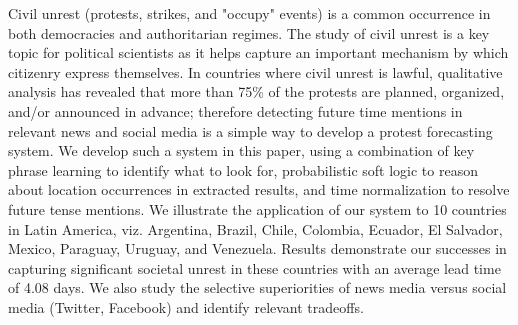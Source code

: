 Civil unrest (protests, strikes, and "occupy" events) is a common occurrence in both democracies and authoritarian regimes. The study of civil unrest is a key topic for political scientists as it helps capture an important mechanism by which citizenry express themselves. In countries where civil unrest is lawful, qualitative analysis has revealed that more than 75\% of the protests are planned, organized, and/or announced in advance; therefore detecting future time mentions in relevant news and social media is a simple way to develop a protest forecasting system. We develop such a system in this paper, using a combination of key phrase learning to identify what to look for, probabilistic soft logic to reason about location occurrences in extracted results, and time normalization to resolve future tense mentions. We illustrate the application of our system to 10 countries in Latin America, viz. Argentina, Brazil, Chile, Colombia, Ecuador, El Salvador, Mexico, Paraguay, Uruguay, and Venezuela. Results demonstrate our successes in capturing significant societal unrest in these countries with an average lead time of 4.08 days. We also study the selective superiorities of news media versus social media (Twitter, Facebook) and identify relevant tradeoffs.
